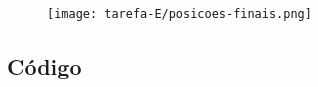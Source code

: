 
\begin{figure}[h!]
    \centering
    \texttt{[image: tarefa-E/posicoes-finais.png]}
    \caption{}
    \label{fig:posicoes-finais-e}
\end{figure}


\subsection*{Código}

\clearpage 